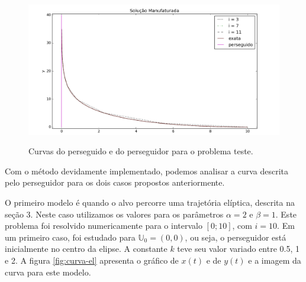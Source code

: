 \documentclass[a4paper,10pt]{article}
\begin{document}
  \begin{figure}[H]
   \includegraphics[width=\textwidth]{manufaturada.png}
   \label{fig:manufaturada}
   \caption{Curvas do perseguido e do perseguidor para o problema teste.}
  \end{figure}

  
  Com o método devidamente implementado, podemos analisar a curva descrita pelo perseguidor para os dois casos propostos anteriormente.
 
  O primeiro modelo é quando o alvo percorre uma trajetória elíptica, descrita na seção 3. Neste caso utilizamos os valores para os parâmetros $\alpha = 2$ e $\beta = 1$. Este problema foi resolvido numericamente para o intervalo $[0; 10]$, com $i = 10$. Em um primeiro caso, foi estudado para $\mathbb{U}_{0} = (0, 0)$, ou seja, o perseguidor está inicialmente no centro da elipse. A constante $k$ teve seu valor variado entre 0.5, 1 e 2. A figura \ref{fig:curva-el} apresenta o gráfico de $x(t)$ e de $y(t)$ e a imagem da curva para este modelo.
  
\end{document}
